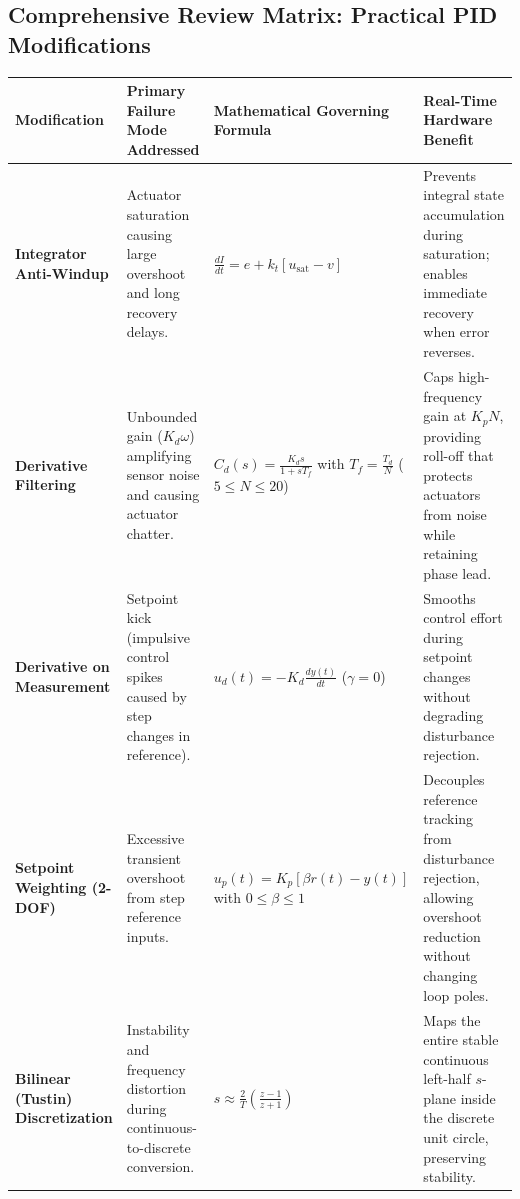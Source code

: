 \documentclass[12pt,onecolumn,twoside ]{article}
\begin{document}
	\subsection{Comprehensive Review Matrix: Practical PID Modifications}
	\begin{center}\small\begin{tabularx}{\textwidth}{*{4}{Y}}
			\toprule
			\textbf{Modification} & \textbf{Primary Failure Mode Addressed} & \textbf{Mathematical Governing Formula} & \textbf{Real-Time Hardware Benefit} \\
			\midrule
			\textbf{Integrator Anti-Windup} & Actuator saturation causing large overshoot and long recovery delays. & $\frac{dI}{dt} = e + k_t [u_{\text{sat}} - v]$ & Prevents integral state accumulation during saturation; enables immediate recovery when error reverses. \\
			\textbf{Derivative Filtering} & Unbounded gain ($K_d \omega$) amplifying sensor noise and causing actuator chatter. & $C_d(s) = \frac{K_d s}{1 + s T_f}$ with $T_f = \frac{T_d}{N}$ ($5 \le N \le 20$) & Caps high-frequency gain at $K_p N$, providing roll-off that protects actuators from noise while retaining phase lead. \\
			\textbf{Derivative on Measurement} & Setpoint kick (impulsive control spikes caused by step changes in reference). & $u_d(t) = -K_d \frac{dy(t)}{dt}$ ($\gamma = 0$) & Smooths control effort during setpoint changes without degrading disturbance rejection. \\
			\textbf{Setpoint Weighting (2-DOF)} & Excessive transient overshoot from step reference inputs. & $u_p(t) = K_p [\beta r(t) - y(t)]$ with $0 \le \beta \le 1$ & Decouples reference tracking from disturbance rejection, allowing overshoot reduction without changing loop poles. \\
			\textbf{Bilinear (Tustin) Discretization} & Instability and frequency distortion during continuous-to-discrete conversion. & $s \approx \frac{2}{T} \left( \frac{z - 1}{z + 1} \right)$ & Maps the entire stable continuous left-half $s$-plane inside the discrete unit circle, preserving stability. \\
			\bottomrule
	\end{tabularx}\end{center}
	
\end{document}
